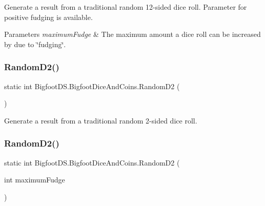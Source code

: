 Generate a result from a traditional random 12-\/sided dice roll. Parameter for positive fudging is available. 


\begin{DoxyParams}{Parameters}
{\em maximum\+Fudge} & The maximum amount a dice roll can be increased by due to \char`\"{}fudging\char`\"{}.\\
\hline
\end{DoxyParams}
\mbox{\label{class_bigfoot_d_s_1_1_bigfoot_dice_and_coins_a2733fdae70917bee5060cd4acbf338ab}} 
\subsubsection{\texorpdfstring{Random\+D2()}{RandomD2()}\hspace{0.1cm}{\footnotesize\ttfamily [1/2]}}
{\footnotesize\ttfamily static int Bigfoot\+D\+S.\+Bigfoot\+Dice\+And\+Coins.\+Random\+D2 (\begin{DoxyParamCaption}{ }\end{DoxyParamCaption})\hspace{0.3cm}{\ttfamily [static]}}



Generate a result from a traditional random 2-\/sided dice roll. 

\mbox{\label{class_bigfoot_d_s_1_1_bigfoot_dice_and_coins_a1733e6410ac74e8bf64a053d6c52d898}} 
\subsubsection{\texorpdfstring{Random\+D2()}{RandomD2()}\hspace{0.1cm}{\footnotesize\ttfamily [2/2]}}
{\footnotesize\ttfamily static int Bigfoot\+D\+S.\+Bigfoot\+Dice\+And\+Coins.\+Random\+D2 (\begin{DoxyParamCaption}\item[{int}]{maximum\+Fudge }\end{DoxyParamCaption})\hspace{0.3cm}{\ttfamily [static]}}



